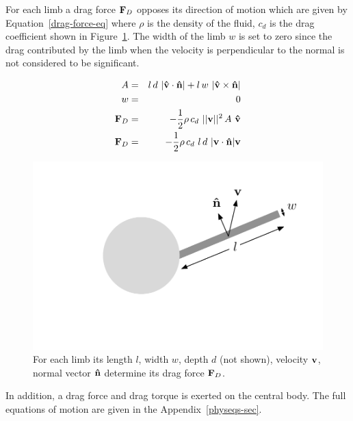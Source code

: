 For each limb a drag force $\mathbf{F}_D$ opposes its direction of motion
which are given by Equation~\ref{drag-force-eq} where $\rho$ is the
density of the fluid, $c_d$ is the drag coefficient shown in
Figure~\ref{drag-force}.  The width of the limb $w$ is set to zero
since the drag contributed by the limb when the velocity is
perpendicular to the normal is not considered to be significant.

\begin{eqnarray}
  A &=& l\,d~ |\mathbf{\hat{v}} \cdot \mathbf{\hat{n}}| + l\, w~|\mathbf{\hat{v}} \times \mathbf{\hat{n}}|\\
  w &=& 0 \\
  \mathbf{F}_D &=& -\frac{1}{2} \rho\,c_d~||\mathbf{v}||^2\,A~\mathbf{\hat{v}} \\
  \mathbf{F}_D &=& -\frac{1}{2} \rho\, c_d~ l\,d~|\mathbf{v} \cdot \mathbf{\hat{n}}|\mathbf{v} \label{drag-force-eq} 
\end{eqnarray}


\begin{figure}[h]  
  \centering
  \includegraphics[scale=0.7]{fig/drag-force.pdf} 
  \vspace{-45pt}
  \caption[Diagram of drag force]{\label{drag-force}For each limb its
    length $l$, width $w$, depth $d$ (not shown), velocity $\mathbf{v} $,
    normal vector $\mathbf{\hat{n}}$ determine its drag force $\mathbf{F}_D$.}
\end{figure}

In addition, a drag force and drag torque is exerted on the central
body.  The full equations of motion are given in the
Appendix~\ref{physeqs-sec}.

